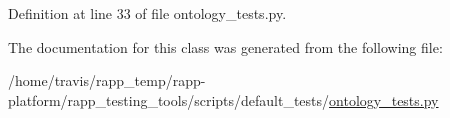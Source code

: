 Definition at line 33 of file ontology\-\_\-tests.\-py.



The documentation for this class was generated from the following file\-:\begin{DoxyCompactItemize}
\item 
/home/travis/rapp\-\_\-temp/rapp-\/platform/rapp\-\_\-testing\-\_\-tools/scripts/default\-\_\-tests/\hyperlink{ontology__tests_8py}{ontology\-\_\-tests.\-py}\end{DoxyCompactItemize}

